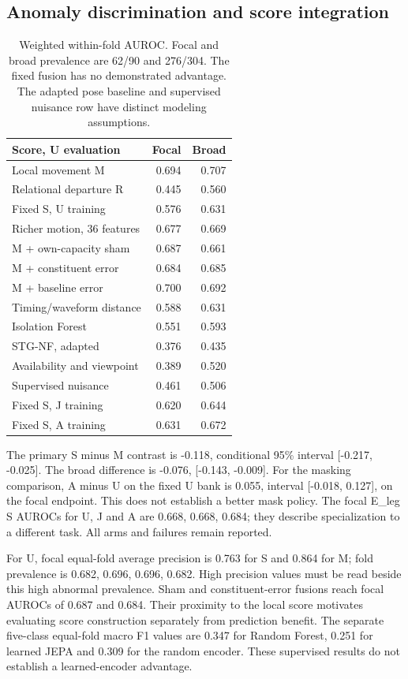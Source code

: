 \documentclass[letterpaper]{article}
\begin{document}
\subsection{Anomaly discrimination and score integration}

\begin{table}[t]
\centering
\begin{tabular}{lrr}
\toprule
Score, U evaluation & Focal & Broad \\
\midrule
Local movement M & 0.694 & 0.707 \\
Relational departure R & 0.445 & 0.560 \\
Fixed S, U training & 0.576 & 0.631 \\
Richer motion, 36 features & 0.677 & 0.669 \\
M + own-capacity sham & 0.687 & 0.661 \\
M + constituent error & 0.684 & 0.685 \\
M + baseline error & 0.700 & 0.692 \\
Timing/waveform distance & 0.588 & 0.631 \\
Isolation Forest & 0.551 & 0.593 \\
STG-NF, adapted & 0.376 & 0.435 \\
Availability and viewpoint & 0.389 & 0.520 \\
Supervised nuisance & 0.461 & 0.506 \\
Fixed S, J training & 0.620 & 0.644 \\
Fixed S, A training & 0.631 & 0.672 \\
\bottomrule
\end{tabular}
\caption{Weighted within-fold AUROC. Focal and broad prevalence are 62/90 and 276/304. The fixed fusion has no demonstrated advantage. The adapted pose baseline and supervised nuisance row have distinct modeling assumptions.}
\label{tab:detection}
\end{table}

The primary S minus M contrast is -0.118, conditional 95\% interval {[}-0.217, -0.025{]}. The broad difference is -0.076, {[}-0.143, -0.009{]}. For the masking comparison, A minus U on the fixed U bank is 0.055, interval {[}-0.018, 0.127{]}, on the focal endpoint. This does not establish a better mask policy. The focal E\_leg S AUROCs for U, J and A are 0.668, 0.668, 0.684; they describe specialization to a different task. All arms and failures remain reported.

For U, focal equal-fold average precision is 0.763 for S and 0.864 for M; fold prevalence is 0.682, 0.696, 0.696, 0.682. High precision values must be read beside this high abnormal prevalence. Sham and constituent-error fusions reach focal AUROCs of 0.687 and 0.684. Their proximity to the local score motivates evaluating score construction separately from prediction benefit. The separate five-class equal-fold macro F1 values are 0.347 for Random Forest, 0.251 for learned JEPA and 0.309 for the random encoder. These supervised results do not establish a learned-encoder advantage.
\end{document}
